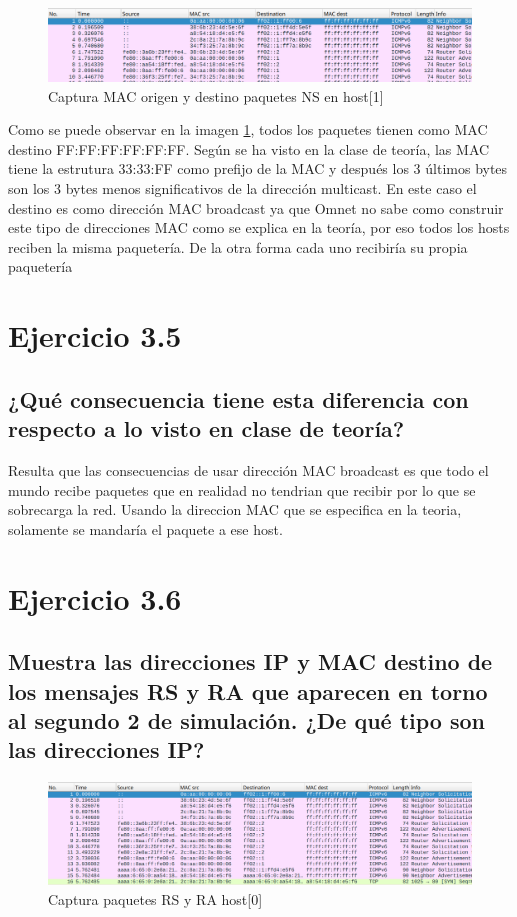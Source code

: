 \begin{figure}[H]
    \centering
    \includegraphics[width=135mm, scale=0.75]{imaxes/captura_ejer3_4.png}
    \caption{Captura MAC origen y destino paquetes NS en host[1]}
    \label{fig:ip_mac_host1}
\end{figure}

Como se puede observar en la imagen \ref{fig:ip_mac_host1}, todos los paquetes tienen como MAC destino FF:FF:FF:FF:FF:FF. Según se ha visto en la clase de teoría, las MAC tiene la estrutura 33:33:FF como prefijo de la MAC y después los 3 últimos bytes son los 3 bytes menos significativos de la dirección multicast. En este caso el destino es como dirección MAC broadcast ya que Omnet no sabe como construir este tipo de direcciones MAC como se explica en la teoría, por eso todos los hosts reciben la misma paquetería. De la otra forma cada uno recibiría su propia paquetería

\section{Ejercicio 3.5}
\subsection{¿Qué consecuencia tiene esta diferencia con respecto a lo visto en clase de teoría?}

Resulta que las consecuencias de usar dirección MAC broadcast es que todo el mundo recibe paquetes que en realidad no tendrian que recibir por lo que se sobrecarga la red. Usando la direccion MAC que se especifica en la teoria, solamente se mandaría el paquete a ese host.

\section{Ejercicio 3.6} 
\subsection{Muestra las direcciones IP y MAC destino de los mensajes RS y RA que aparecen en torno al segundo 2 de
simulación. ¿De qué tipo son las direcciones IP?}

\begin{figure}[H]
    \centering
    \includegraphics[width=135mm, scale=0.75]{imaxes/captura_ejer3_6.png}
    \caption{Captura paquetes RS y RA host[0]}
    \label{fig:rs_ra_h1}
\end{figure}

